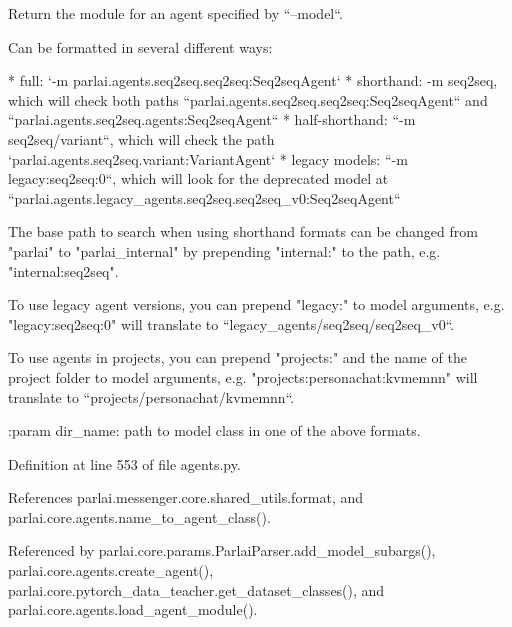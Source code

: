 \begin{DoxyVerb}Return the module for an agent specified by ``--model``.

Can be formatted in several different ways:

* full: `-m parlai.agents.seq2seq.seq2seq:Seq2seqAgent`
* shorthand: -m seq2seq, which will check both paths
  ``parlai.agents.seq2seq.seq2seq:Seq2seqAgent`` and
  ``parlai.agents.seq2seq.agents:Seq2seqAgent``
* half-shorthand: ``-m seq2seq/variant``, which will check the path
  `parlai.agents.seq2seq.variant:VariantAgent`
* legacy models: ``-m legacy:seq2seq:0``, which will look for the deprecated
  model at ``parlai.agents.legacy_agents.seq2seq.seq2seq_v0:Seq2seqAgent``

The base path to search when using shorthand formats can be changed from
"parlai" to "parlai_internal" by prepending "internal:" to the path, e.g.
"internal:seq2seq".

To use legacy agent versions, you can prepend "legacy:" to model arguments,
e.g. "legacy:seq2seq:0" will translate to ``legacy_agents/seq2seq/seq2seq_v0``.

To use agents in projects, you can prepend "projects:" and the name of the
project folder to model arguments, e.g. "projects:personachat:kvmemnn"
will translate to ``projects/personachat/kvmemnn``.

:param dir_name: path to model class in one of the above formats.
\end{DoxyVerb}
 

Definition at line 553 of file agents.\+py.



References parlai.\+messenger.\+core.\+shared\+\_\+utils.\+format, and parlai.\+core.\+agents.\+name\+\_\+to\+\_\+agent\+\_\+class().



Referenced by parlai.\+core.\+params.\+Parlai\+Parser.\+add\+\_\+model\+\_\+subargs(), parlai.\+core.\+agents.\+create\+\_\+agent(), parlai.\+core.\+pytorch\+\_\+data\+\_\+teacher.\+get\+\_\+dataset\+\_\+classes(), and parlai.\+core.\+agents.\+load\+\_\+agent\+\_\+module().

